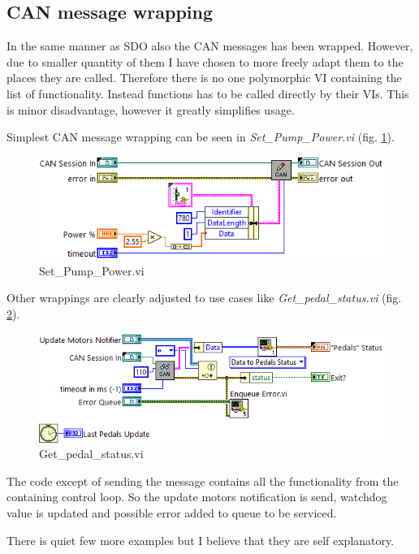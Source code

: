 \subsection{CAN message wrapping} \label{sec:CAN_wrapping}
In the same manner as SDO also the CAN messages has been wrapped. However, due to smaller quantity of them I have chosen to more freely adapt them to the places they are called. Therefore there is no one polymorphic VI containing the list of functionality.
Instead functions has to be called directly by their VIs. This is minor disadvantage, however it greatly simplifies usage.

Simplest CAN message wrapping can be seen in \textit{Set\_Pump\_Power.vi} (fig. \ref{vi:Set_Pump_Power}).
\begin{figure}[H]
    \centering
    \includegraphics[scale=\visc,max width=\textwidth]{figures/Set_Pump_Powerd}
    \caption{Set\_Pump\_Power.vi}
    \label{vi:Set_Pump_Power}
\end{figure}

Other wrappings are clearly adjusted to use cases like \textit{Get\_pedal\_status.vi} (fig. \ref{vi:Get_pedal_status}).
\begin{figure}[H]
    \centering
    \includegraphics[scale=\visc,max width=\textwidth]{figures/Get_pedal_statusd}
    \caption{Get\_pedal\_status.vi}
    \label{vi:Get_pedal_status}
\end{figure}
The code except of sending the message contains all the functionality from the containing control loop. So the update motors notification is send, watchdog value is updated and possible error added to queue to be serviced.

There is quiet few more examples but I believe that they are self explanatory.

